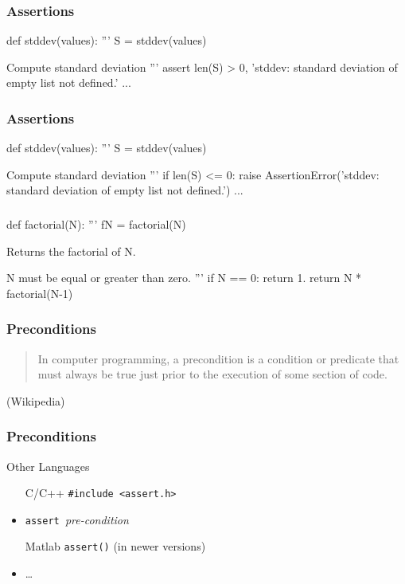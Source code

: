 \begin{frame}[fragile] %
\frametitle{Assertions}
\begin{python}
def stddev(values):
    '''
    S = stddev(values)

    Compute standard deviation
    '''
    assert len(S) > 0, 'stddev: standard deviation of empty list not defined.'
    ...
\end{python}
\end{frame}

\begin{frame}[fragile] %
\frametitle{Assertions}

\begin{python}
def stddev(values):
    '''
    S = stddev(values)

    Compute standard deviation
    '''
    if len(S) <= 0:
        raise AssertionError('stddev: standard deviation of empty list not defined.')
    ...
\end{python}

\end{frame}

\begin{frame}[fragile] %
\frametitle{}

\begin{python}
def factorial(N):
    '''
    fN = factorial(N)

    Returns the factorial of N.

    N must be equal or greater than zero.
    '''
    if N == 0:
        return 1.
    return N * factorial(N-1)
\end{python}
\end{frame}

\begin{frame}[fragile] %
\frametitle{Preconditions}

\begin{quote}
In computer programming, a precondition is a condition or predicate that must always be true just prior to the execution of some section of code.
\end{quote}

\begin{flushright}
(Wikipedia)
\end{flushright}

\end{frame}

\begin{frame}[fragile] %
\frametitle{Preconditions}
\begin{block}{Other Languages}
\begin{itemize}
\item[C/C++] \lstinline{#include <assert.h>}
\item[Java] \lstinline{assert }\textit{pre-condition}
\item[Matlab] \lstinline{assert()} (in newer versions)
\item[\ldots] \ldots
\end{itemize}
\end{block}
\end{frame}

